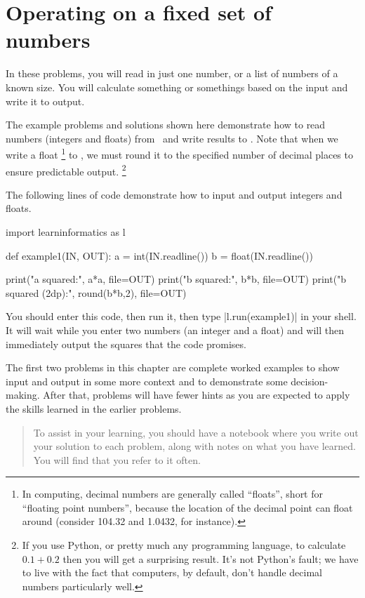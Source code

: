 
\chapter{Operating on a fixed set of numbers}

In these problems, you will read in just one number, or a list of numbers of a known size.
You will calculate something or somethings based on the input and write it to output.

The example problems and solutions shown here demonstrate how to read numbers (integers
and floats) from \IN\ and write results to \OUT. Note that when we write a float%
\footnote{In computing, decimal numbers are generally called ``floats'', short for
    ``floating point numbers'', because the location of the decimal point can float around
    (consider 104.32 and 1.0432, for instance).}
to \OUT, we must round it to the specified number of decimal places to ensure predictable
output.%
\footnote{If you use Python, or pretty much any programming language, to calculate
  $0.1+0.2$ then you will get a surprising result. It's not Python's fault; we have to live
  with the fact that computers, by default, don't handle decimal numbers particularly
well.}

The following lines of code demonstrate how to input and output integers and floats. 

\begin{pythoncode} 
  import learninformatics as l

  def example1(IN, OUT):
    a = int(IN.readline())
    b = float(IN.readline())

    print("a squared:", a*a, file=OUT)
    print("b squared:", b*b, file=OUT)
    print("b squared (2dp):", round(b*b,2), file=OUT)
\end{pythoncode}

You should enter this code, then run it, then type \pycode|l.run(example1)| in your shell.
It will wait while you enter two numbers (an integer and a float) and will then
immediately output the squares that the code promises.

The first two problems in this chapter are complete worked examples to show input and
output in some more context and to demonstrate some decision-making. After that, problems
will have fewer hints as you are expected to apply the skills learned in the earlier
problems.

\begin{quote}
  \color{blue}
  To assist in your learning, you should have a notebook where you write out your solution
  to each problem, along with notes on what you have learned. You will find that you refer
  to it often.
\end{quote}

